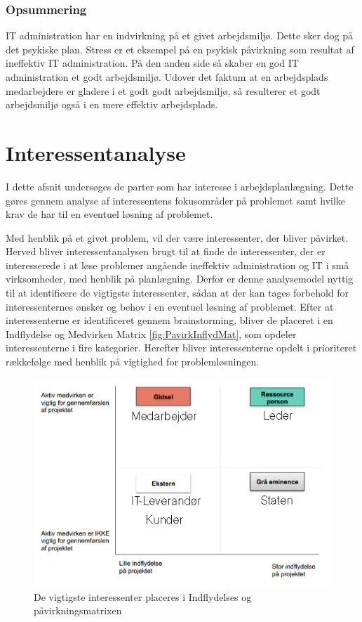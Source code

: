\subsubsection{Opsummering}

IT administration har en indvirkning på et givet arbejdsmiljø. Dette sker dog på det psykiske plan. Stress er et eksempel på en psykisk påvirkning som resultat af ineffektiv IT administration. På den anden side så skaber en god IT administration et godt arbejdsmiljø. Udover det faktum at en arbejdsplads medarbejdere er gladere i et godt godt arbejdsmiljø, så resulterer et godt arbejdsmiljø også i en mere effektiv arbejdsplads.

\section{Interessentanalyse}
I dette afsnit undersøges de parter som har interesse i arbejdsplanlægning. Dette gøres gennem analyse af interessentens fokusområder på problemet samt hvilke krav de har til en eventuel løsning af problemet.

Med henblik på et givet problem, vil der være interessenter, der bliver påvirket. Herved bliver interessentanalysen brugt til at finde de interessenter, der er interesserede i at løse problemer angående ineffektiv administration og IT i små virksomheder, med henblik på planlægning.
Derfor er denne analysemodel nyttig til at identificere de vigtigste interessenter, sådan at der kan tages forbehold for interessenternes ønsker og behov i en eventuel løsning af problemet. Efter at interessenterne er identificeret gennem brainstorming, bliver de placeret i en Indflydelse og Medvirken Matrix \ref{fig:PavirkInflydMat}, som opdeler interessenterne i fire kategorier. Herefter bliver interessenterne opdelt i prioriteret rækkefølge med henblik på vigtighed for problemløsningen.

\begin{figure}[H]
\centering
\includegraphics{figures/IndflydelsePaaMatrixMedInteress.png}
\caption{De vigtigste interessenter placeres i Indflydelses og påvirkningsmatrixen}
\label{fig:InteressentMatrix}
\end{figure}

